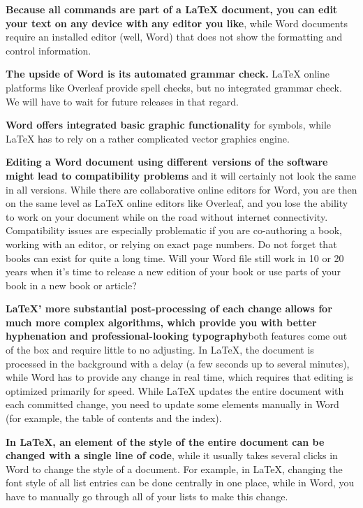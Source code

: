 \textbf{Because all commands are part of a LaTeX document, you can edit your text on any device with any editor you like}, while Word documents require an installed editor (well, Word) that does not show the formatting and control information.

\textbf{The upside of Word is its automated grammar check.} LaTeX online platforms like Overleaf provide spell checks, but no integrated grammar check. We will have to wait for future releases in that regard. 

\textbf{Word offers integrated basic graphic functionality} for symbols, while LaTeX has to rely on a rather complicated vector graphics engine.

\textbf{Editing a Word document using different versions of the software might lead to compatibility problems} and it will certainly not look the same in all versions. While there are collaborative online editors for Word, you are then on the same level as LaTeX online editors like Overleaf, and you lose the ability to work on your document while on the road without internet connectivity. Compatibility issues are especially problematic if you are co-authoring a book, working with an editor, or relying on exact page numbers. Do not forget that books can exist for quite a long time. Will your Word file still work in 10 or 20 years when it's time to release a new edition of your book or use parts of your book in a new book or article?

\textbf{LaTeX' more substantial post-processing of each change allows for much more complex algorithms, which provide you with better hyphenation and professional\hyp{}looking typography}\emdash{}both features come out of the box and require little to no adjusting. In LaTeX, the document is processed in the background with a delay (a few seconds up to several minutes), while Word has to provide any change in real time, which requires that editing is optimized primarily for speed. While LaTeX updates the entire document with each committed change, you need to update some elements manually in Word (for example, the table of contents and the index). 

\textbf{In LaTeX, an element of the style of the entire document can be changed with a single line of code}, while it usually takes several clicks in Word to change the style of a document. For example, in LaTeX, changing the font style of all list entries can be done centrally in one place, while in Word, you have to manually go through all of your lists to make this change.

